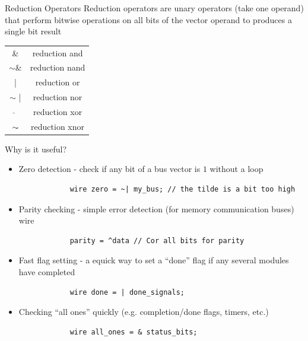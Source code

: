 \begin{parag}{Reduction Operators}
    Reduction operators are unary operators (take one operand) that perform bitwise operations on all bits of the vector operand to produces a single bit result
    \begin{center} \begin{tabular}{cc}\hline \& & reduction and \\ $\sim$\&  & reduction nand  \\ | &reduction or  \\ $\sim$ |  & reduction nor \\ $\hat{}$ & reduction xor \\$\sim \hat{}$  & reduction xnor \end{tabular} \end{center} 
\end{parag}
\begin{parag}{Why is it useful?}
\begin{itemize}
    \item Zero detection - check if any bit of a bus vector is $1$ without a loop
        \begin{lstlisting}
            wire zero = ~| my_bus; // the tilde is a bit too high
        \end{lstlisting}
    \item Parity checking - simple error detection (for memory communication buses) wire
        \begin{lstlisting}
            parity = ^data // Cor all bits for parity
        \end{lstlisting}
    \item Fast flag setting - a equick way to set a ``done'' flag if any several modules have completed
        \begin{lstlisting}
            wire done = | done_signals;
        \end{lstlisting}
    \item Checking ``all ones'' quickly (e.g. completion/done flags, timers, etc.)
        \begin{lstlisting}
            wire all_ones = & status_bits;
        \end{lstlisting}
        
\end{itemize}

    
\end{parag}



